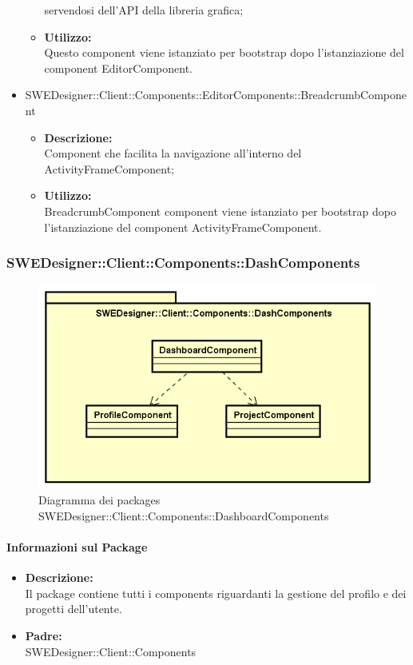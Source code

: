 \begin{itemize}
\begin{itemize}
				servendosi dell'API della libreria grafica;
				\item \textbf{Utilizzo: }\\
				Questo component viene istanziato per bootstrap dopo l'istanziazione
				del component EditorComponent.
			\end{itemize}
			\item SWEDesigner::Client::Components::EditorComponents::BreadcrumbComponent
			\begin{itemize}
				\item \textbf{Descrizione: }\\
				Component che facilita la navigazione all'interno del ActivityFrameComponent;
				\item \textbf{Utilizzo: }\\
				BreadcrumbComponent component viene istanziato per bootstrap dopo l'istanziazione
				del component ActivityFrameComponent.
			\end{itemize}
		\end{itemize}

		\subsubsection{SWEDesigner::Client::Components::DashComponents}
		 \begin{figure}[h!]
		\centering
		\includegraphics[scale=0.4]{Disegnetti/SWEDesigner__Client__Components__DashComponents.png}
		\caption{Diagramma dei packages SWEDesigner::Client::Components::DashboardComponents}
 		\end{figure}
		\paragraph{Informazioni sul Package}
		\begin{itemize}
			\item \textbf{Descrizione: }\\
			Il package contiene tutti i components riguardanti la gestione del profilo
			e dei progetti dell'utente.
			\item \textbf{Padre: }\\ SWEDesigner::Client::Components
		\end{itemize}

